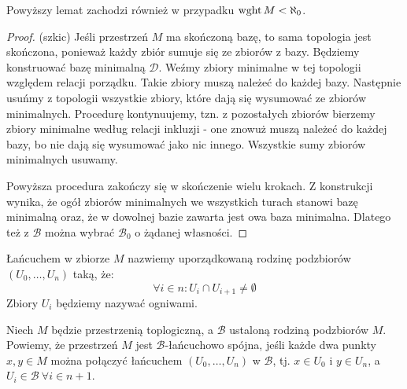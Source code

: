 \begin{fact}
  Powyższy lemat zachodzi również w przypadku $\operatorname{wght} M < \aleph_0$.
  \begin{proof}(szkic)
    Jeśli przestrzeń $M$ ma skończoną bazę, to sama topologia jest skończona, ponieważ każdy zbiór sumuje się ze zbiorów z bazy. Będziemy konstruować bazę minimalną $\mathcal D$. Weźmy zbiory minimalne w tej topologii względem relacji porządku. Takie zbiory muszą należeć do każdej bazy. Następnie usuńmy z topologii wszystkie zbiory, które dają się wysumować ze zbiorów minimalnych. Procedurę kontynuujemy, tzn. z pozostałych zbiorów bierzemy zbiory minimalne według relacji inkluzji - one znowuż muszą należeć do każdej bazy, bo nie dają się wysumować jako nic innego. Wszystkie sumy zbiorów minimalnych usuwamy.
    
    Powyższa procedura zakończy się w skończenie wielu krokach. Z konstrukcji wynika, że ogół zbiorów minimalnych we wszystkich turach stanowi bazę minimalną oraz, że w dowolnej bazie zawarta jest owa baza minimalna. Dlatego też z $\mathcal B$ można wybrać $\mathcal B_0$ o żądanej własności.
  \end{proof}
\end{fact}

\begin{df}
  Łańcuchem w zbiorze $M$ nazwiemy uporządkowaną rodzinę podzbiorów $(U_0, \ldots, U_n)$ taką, że:
  \[
    \forall i \in n: U_i \cap U_{i+1} \neq \emptyset
  \]
  Zbiory $U_i$ będziemy nazywać ogniwami.
\end{df}

\begin{df}
  Niech $M$ będzie przestrzenią toplogiczną, a $\mathcal B$ ustaloną rodziną podzbiorów $M$. Powiemy, że przestrzeń $M$ jest $\mathcal B$-łańcuchowo spójna, jeśli każde dwa punkty $x,y \in M$ można połączyć łańcuchem $(U_0, \ldots, U_n)$ w $\mathcal B$, tj. $x \in U_0$ i $y \in U_n$, a $U_i \in \mathcal B\ \forall i \in n+1$.
\end{df}

